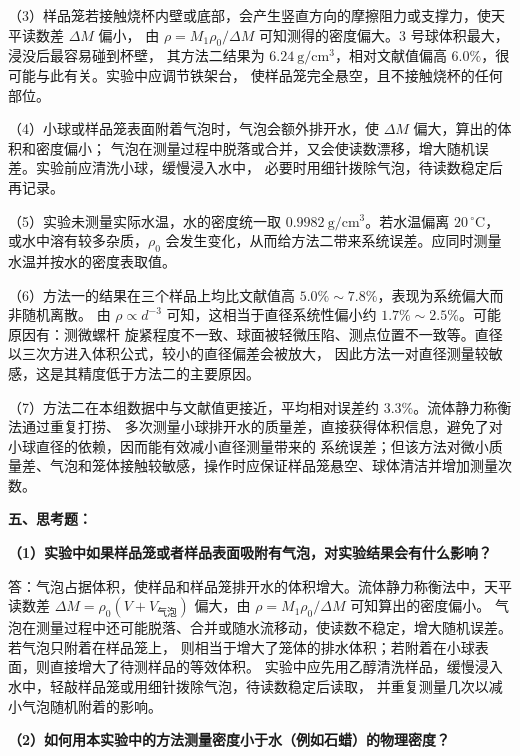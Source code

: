 \documentclass[12pt,a4paper,fontset=windows]{ctexart}
\begin{document}
（3）样品笼若接触烧杯内壁或底部，会产生竖直方向的摩擦阻力或支撑力，使天平读数差 $\Delta M$ 偏小，
由 $\rho=M_1\rho_0/\Delta M$ 可知测得的密度偏大。3 号球体积最大，浸没后最容易碰到杯壁，
其方法二结果为 $6.24\ \mathrm{g/cm^3}$，相对文献值偏高 $6.0\%$，很可能与此有关。实验中应调节铁架台，
使样品笼完全悬空，且不接触烧杯的任何部位。

（4）小球或样品笼表面附着气泡时，气泡会额外排开水，使 $\Delta M$ 偏大，算出的体积和密度偏小；
气泡在测量过程中脱落或合并，又会使读数漂移，增大随机误差。实验前应清洗小球，缓慢浸入水中，
必要时用细针拨除气泡，待读数稳定后再记录。

（5）实验未测量实际水温，水的密度统一取 $0.9982\ \mathrm{g/cm^3}$。若水温偏离 $20\,^\circ$C，
或水中溶有较多杂质，$\rho_0$ 会发生变化，从而给方法二带来系统误差。应同时测量水温并按水的密度表取值。

（6）方法一的结果在三个样品上均比文献值高 $5.0\%\sim7.8\%$，表现为系统偏大而非随机离散。
由 $\rho\propto d^{-3}$ 可知，这相当于直径系统性偏小约 $1.7\%\sim2.5\%$。可能原因有：测微螺杆
旋紧程度不一致、球面被轻微压陷、测点位置不一致等。直径以三次方进入体积公式，较小的直径偏差会被放大，
因此方法一对直径测量较敏感，这是其精度低于方法二的主要原因。

（7）方法二在本组数据中与文献值更接近，平均相对误差约 $3.3\%$。流体静力称衡法通过重复打捞、
多次测量小球排开水的质量差，直接获得体积信息，避免了对小球直径的依赖，因而能有效减小直径测量带来的
系统误差；但该方法对微小质量差、气泡和笼体接触较敏感，操作时应保证样品笼悬空、球体清洁并增加测量次数。

\vspace{0.3cm}

\noindent\textbf{五、思考题：}

\vspace{0.15cm}
\noindent\textbf{（1）实验中如果样品笼或者样品表面吸附有气泡，对实验结果会有什么影响？}

\vspace{0.05cm}
答：气泡占据体积，使样品和样品笼排开水的体积增大。流体静力称衡法中，天平读数差
$\Delta M=\rho_0(V+V_{\text{气泡}})$ 偏大，由 $\rho=M_1\rho_0/\Delta M$ 可知算出的密度偏小。
气泡在测量过程中还可能脱落、合并或随水流移动，使读数不稳定，增大随机误差。若气泡只附着在样品笼上，
则相当于增大了笼体的排水体积；若附着在小球表面，则直接增大了待测样品的等效体积。
实验中应先用乙醇清洗样品，缓慢浸入水中，轻敲样品笼或用细针拨除气泡，待读数稳定后读取，
并重复测量几次以减小气泡随机附着的影响。

\vspace{0.15cm}
\noindent\textbf{（2）如何用本实验中的方法测量密度小于水（例如石蜡）的物理密度？}
\end{document}
